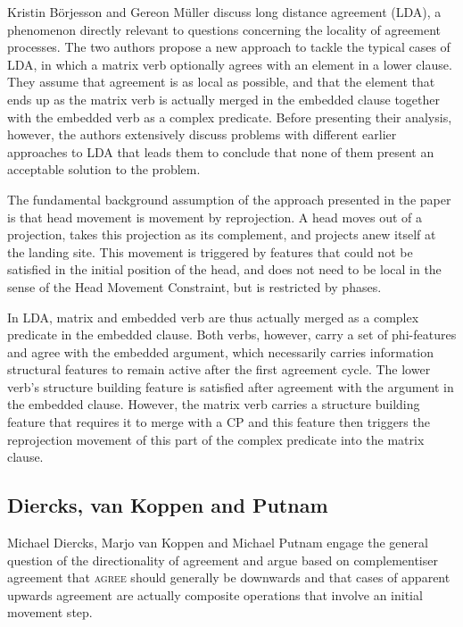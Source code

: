 \documentclass[output=paper
,modfonts
,nonflat]{langsci/langscibook}
\begin{document}
Kristin Börjesson and Gereon Müller discuss long distance agreement (LDA), a phenomenon directly relevant to questions concerning the locality of agreement processes. The two authors propose a new approach to tackle the typical cases of LDA, in which a matrix verb optionally agrees with an element in a lower clause. They assume that agreement is as local as possible, and that the element that ends up as the matrix verb is actually merged in the embedded clause together with the embedded verb as a complex predicate. Before presenting their analysis, however, the authors extensively discuss problems with different earlier approaches to LDA that leads them to conclude that none of them present an acceptable solution to the problem.

The fundamental background assumption of the approach presented in the paper is that head movement is movement by reprojection. A head moves out of a projection, takes this projection as its complement, and projects anew itself at the landing site. This movement is triggered by features that could not be satisfied in the initial position of the head, and does not need to be local in the sense of the Head Movement Constraint, but is restricted by phases.

In LDA, matrix and embedded verb are thus actually merged as a complex predicate in the embedded clause. Both verbs, however, carry a set of phi-features and agree with the embedded argument, which necessarily carries information structural features to remain active after the first agreement cycle. The lower verb’s structure building feature is satisfied after agreement with the argument in the embedded clause. However, the matrix verb carries a structure building feature that requires it to merge with a CP and this feature then triggers the reprojection movement of this part of the complex predicate into the matrix clause.



\subsection{Diercks, van Koppen and Putnam}
\label{sec:diercksetal}

Michael Diercks, Marjo van Koppen and Michael Putnam engage the general question of the directionality of agreement and argue based on complementiser agreement that \textsc{agree} should generally be downwards and that cases of apparent upwards agreement are actually composite operations that involve an initial movement step.
\end{document}
